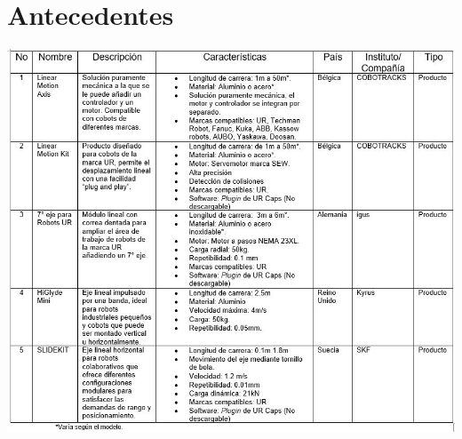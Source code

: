\section{Antecedentes}
\begin{center}
  \includegraphics[scale=0.8]{Tablas/tabla_antecedentes.JPG}
  \label{fig:antecedentes}
\end{center}